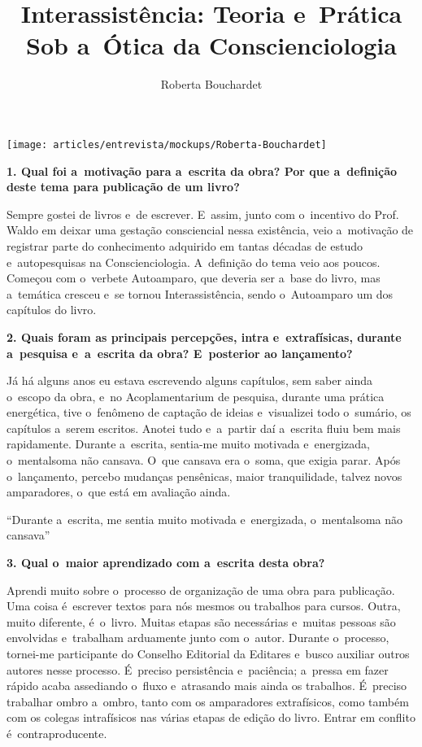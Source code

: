 \documentclass{gescons}
\author{Roberta Bouchardet}
\title{Interassistência: Teoria e~Prática Sob a~Ótica da Conscienciologia}
\begin{document}
    \makeentrevistatitle

    \begin{multicols}{2}

\begin{center}
    \texttt{[image: articles/entrevista/mockups/Roberta-Bouchardet]}
\end{center}


\textbf{1.       Qual foi a~motivação para a~escrita da obra? Por que a~definição deste tema para publicação de um livro?}

Sempre gostei de livros e~de escrever. E~assim, junto com o~incentivo do Prof. Waldo em deixar uma gestação consciencial nessa existência, veio a~motivação de registrar parte do conhecimento adquirido em tantas décadas de estudo e~autopesquisas na Conscienciologia. A~definição do tema veio aos poucos. Começou com o~verbete Autoamparo, que deveria ser a~base do livro, mas a~temática cresceu e~se tornou Interassistência, sendo o~Autoamparo um dos capítulos do livro.

\textbf{2.       Quais foram as principais percepções, intra e~extrafísicas, durante a~pesquisa e~a~escrita da obra? E~posterior ao lançamento?}

Já há alguns anos eu estava escrevendo alguns capítulos, sem saber ainda o~escopo da obra, e~no Acoplamentarium de pesquisa, durante uma prática energética, tive o~fenômeno de captação de ideias e~visualizei todo o~sumário, os capítulos a~serem escritos. Anotei tudo e~a~partir daí a~escrita fluiu bem mais rapidamente. Durante a~escrita, sentia-me muito motivada e~energizada, o~mentalsoma não cansava. O~que cansava era o~soma, que exigia parar. Após o~lançamento, percebo mudanças pensênicas, maior tranquilidade, talvez novos amparadores, o~que está em avaliação ainda.

\begin{pullquote}
    ``Durante a~escrita, me sentia muito motivada e~energizada, o~mentalsoma não cansava''
\end{pullquote}


\textbf{3.       Qual o~maior aprendizado com a~escrita desta obra?}

Aprendi muito sobre o~processo de organização de uma obra para publicação. Uma coisa é~escrever textos para nós mesmos ou trabalhos para cursos. Outra, muito diferente, é~o~livro. Muitas etapas são necessárias e~muitas pessoas são envolvidas e~trabalham arduamente junto com o~autor. Durante o~processo, tornei-me participante do Conselho Editorial da Editares e~busco auxiliar outros autores nesse processo. É~preciso persistência e~paciência; a~pressa em fazer rápido acaba assediando o~fluxo e~atrasando mais ainda os trabalhos. É~preciso trabalhar ombro a~ombro, tanto com os amparadores extrafísicos, como também com os colegas intrafísicos nas várias etapas de edição do livro. Entrar em conflito é~contraproducente.


\end{multicols}
\end{document}
